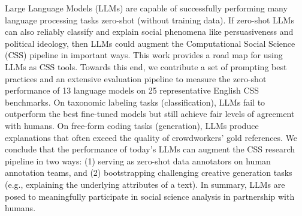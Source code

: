 Large Language Models (LLMs) are capable of successfully performing many language processing tasks zero-shot (without training data). If zero-shot LLMs can also reliably classify and explain social phenomena like persuasiveness and political ideology, then LLMs could augment the Computational Social Science (CSS) pipeline in important ways. This work provides a road map for using LLMs as CSS tools. Towards this end, we contribute a set of prompting best practices and an extensive evaluation pipeline to measure the zero-shot performance of 13 language models on 25 representative English CSS benchmarks. On taxonomic labeling tasks (classification), LLMs fail to outperform the best fine-tuned models but still achieve fair levels of agreement with humans. On free-form coding tasks (generation), LLMs produce explanations that often exceed the quality of crowdworkers' gold references. We conclude that the performance of today's LLMs can augment the CSS research pipeline in two ways: (1) serving as zero-shot data annotators on human annotation teams, and (2) bootstrapping challenging creative generation tasks (e.g., explaining the underlying attributes of a text). In summary, LLMs are posed to meaningfully participate in social science analysis in partnership with humans.